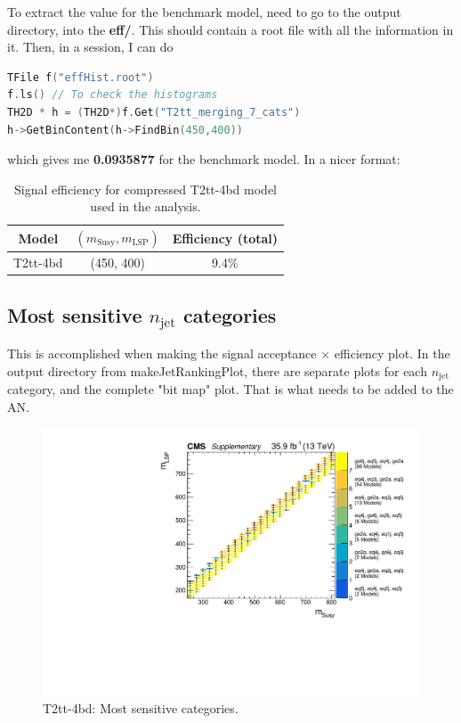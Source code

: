 To extract the value for the benchmark model, need to go to the output directory, into the \textbf{eff/}. This should contain a root file with all the information in it. Then, in a \ROOT session, I can do

\begin{lstlisting}[belowskip=-0.7cm, language=C++, numbers=none]
TFile f("effHist.root")
f.ls() // To check the histograms
TH2D * h = (TH2D*)f.Get("T2tt_merging_7_cats")
h->GetBinContent(h->FindBin(450,400))
\end{lstlisting}

which gives me \textbf{0.0935877} for the benchmark model. In a nicer format:

\begin{table}[H]
    \caption{Signal efficiency for compressed T2tt-4bd model used in the analysis.}
    \label{tab:sig-effT2ttBenchmark}
    \centering
    \begin{tabular}{ ccc }
        \hline \hline
        Model & $(m_{\mathrm{Susy}},m_{\mathrm{LSP}})$ & Efficiency (total) \\
        \hline
        T2tt-4bd & (450, 400) & 9.4\% \\
        \hline \hline
        \end{tabular}
        \end{table}


\subsection{Most sensitive \texorpdfstring{$n_{\mathrm{jet}}$}{njet} categories}

This is accomplished when making the signal acceptance $\times$ efficiency plot. In the output directory from makeJetRankingPlot, there are separate plots for each $n_{\mathrm{jet}}$ category, and the complete "bit map" plot. That is what needs to be added to the AN.

\begin{figure}[H]
\centering
\includegraphics[width=120mm]{./sec31/T2tt_bitMap_improved.pdf}
\caption{T2tt-4bd: Most sensitive categories.}
\end{figure}


